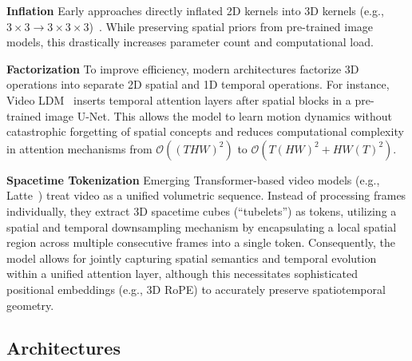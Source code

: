 \documentclass[lettersize,journal]{IEEEtran}
\begin{document}
\noindent \textbf{Inflation} Early approaches directly inflated 2D kernels into 3D kernels (e.g., $3 \times 3 \to 3 \times 3 \times 3$)~\cite{ho2022video}. While preserving spatial priors from pre-trained image models, this drastically increases parameter count and computational load.

\noindent \textbf{Factorization} To improve efficiency, modern architectures factorize 3D operations into separate 2D spatial and 1D temporal operations. For instance, Video LDM~\cite{blattmann2023align} inserts temporal attention layers after spatial blocks in a pre-trained image U-Net. This allows the model to learn motion dynamics without catastrophic forgetting of spatial concepts and reduces computational complexity in attention mechanisms from $\mathcal{O}((THW)^2)$ to $\mathcal{O}(T(HW)^2 + HW(T)^2)$.

\noindent \textbf{Spacetime Tokenization} Emerging Transformer-based video models (e.g., Latte~\cite{ma2025latte}) treat video as a unified volumetric sequence. Instead of processing frames individually, they extract 3D spacetime cubes (``tubelets'') as tokens, utilizing a spatial and temporal downsampling mechanism by encapsulating a local spatial region across multiple consecutive frames into a single token. Consequently, the model allows for jointly capturing spatial semantics and temporal evolution within a unified attention layer, although this necessitates sophisticated positional embeddings (e.g., 3D RoPE) to accurately preserve spatiotemporal geometry.

\subsection{Architectures}


\end{document}

